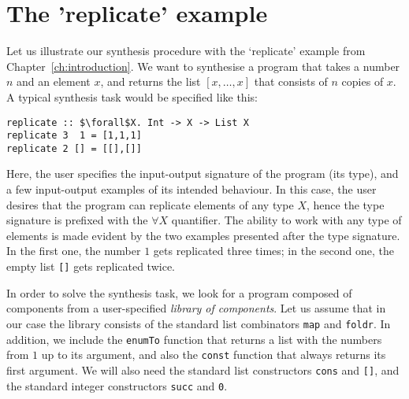 


\section{The 'replicate' example}
Let us illustrate our synthesis procedure with the `replicate' example from Chapter~\ref{ch:introduction}.  We want to synthesise a program that takes a number $n$ and an element $x$, and returns the list $[x, \dots, x]$ that consists of $n$ copies of $x$.  A typical synthesis task would be specified like this:
\begin{lstlisting}[style=plain]
replicate :: $\forall$X. Int -> X -> List X
replicate 3  1 = [1,1,1]
replicate 2 [] = [[],[]]
\end{lstlisting}
Here, the user specifies the input-output signature of the program (its type), and a few input-output examples of its intended behaviour.  In this case, the user desires that the program can replicate elements of any type $X$, hence the type signature is prefixed with the $\forall X$ quantifier.  The ability to work with any type of elements is made evident by the two examples presented after the type signature.  In the first one, the number $1$ gets replicated three times; in the second one, the empty list \lstinline|[]| gets replicated twice.

In order to solve the synthesis task, we look for a program composed of components from a user-specified \emph{library of components}.  Let us assume that in our case the library consists of the standard list combinators \lstinline|map| and \lstinline|foldr|.  In addition, we include the \lstinline|enumTo| function that returns a list with the numbers from $1$ up to its argument, and also the \lstinline|const| function that always returns its first argument.  We will also need the standard list constructors \lstinline|cons| and \lstinline|[]|, and the standard integer constructors \lstinline|succ| and \lstinline|0|.

